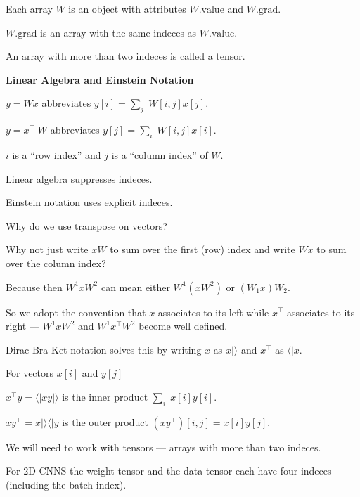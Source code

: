 {\vfill
Each array {\color{red} $W$} is an object with attributes {\color{red} $W.\mathrm{value}$} and {\color{red} $W.\mathrm{grad}$}.

\vfill
{\color{red} $W.\mathrm{grad}$} is an array with the same indeces as {\color{red} $W.\mathrm{value}$}.

\vfill
An array with more than two indeces is called a {\color{red} tensor}.
\slide{}

\centerline{\bf Linear Algebra and Einstein Notation}

\slide{}

$y = Wx$ \hfill abbreviates \hfill $y[i] = \sum_j \;W[i,j]x[j]$.

\vfill

$y = x^\top\;W$ \hfill abbreviates \hfill $y[j] = \sum_i \;W[i,j]x[i]$.

\vfill $i$ is a ``row index'' and $j$ is a ``column index'' of $W$.

\vfill
Linear algebra suppresses indeces.

\vfill
Einstein notation uses explicit indeces.


Why do we use transpose on vectors?

\vfill
Why not just write $xW$ to sum over the first (row) index and write $Wx$ to sum over the column index?

\vfill
Because then $W^1xW^2$ can mean either $W^1(xW^2)$ or $(W_1x)W_2$.

\vfill
So we adopt the convention that $x$ associates to its left while $x^\top$ associates to its right --- $W^1xW^2$ and $W^1x^\top W^2$ become well defined.

\vfill
Dirac Bra-Ket notation solves this by writing $x$ as $x| \rangle$ and $x^\top$ as $\langle |x$.


For vectors $x[i]$ and $y[j]$

\vfill
$x^\top y = \langle|xy|\rangle$ is the inner product $\sum_i \;x[i]y[i]$.

\vfill
$xy^\top = x|\rangle\langle|y$ is the outer product $(xy^\top)[i,j] = x[i]y[j]$.


We will need to work with tensors --- arrays with more than two indeces.

\vfill
For 2D CNNS the weight tensor and the data tensor each have four indeces (including the batch index).

}

